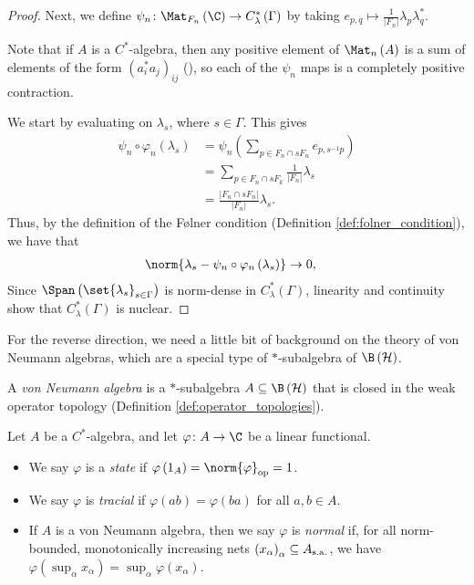 \begin{proof}
  Next, we define $\psi_n\colon \Mat_{F_n}\left( \C \right)\rightarrow C^{\ast}_{\lambda}\left( \Gamma \right)$ by taking $e_{p,q} \mapsto \frac{1}{\left\vert F_n \right\vert}\lambda_{p}\lambda_{q}^{\ast}$.\newline

  Note that if $A$ is a $C^{\ast}$-algebra, then any positive element of $\Mat_n\left( A \right)$ is a sum of elements of the form $\left( a_i^{\ast}a_j \right)_{ij}$ (\cite[Lemma 3.13]{completely_bounded_maps_and_operator_algebras}), so each of the $\psi_n$ maps is a completely positive contraction.\newline

  We start by evaluating on $\lambda_s$, where $s\in\Gamma$. This gives
  \begin{align*}
    \psi_n\circ\varphi_n\left( \lambda_s \right) &= \psi_n\left( \sum_{p\in F_n\cap sF_n}e_{p,s^{-1}p} \right)\\
                                                 &= \sum_{p\in F_n\cap sF_k}\frac{1}{\left\vert F_n \right\vert}\lambda_s\\
                                                 &= \frac{\left\vert F_n \cap sF_n \right\vert}{\left\vert F_n \right\vert}\lambda_s.
  \end{align*}
  Thus, by the definition of the Følner condition (Definition \ref{def:folner_condition}), we have that
  \begin{align*}
    \norm{\lambda_s - \psi_n\circ\varphi_n\left( \lambda_s \right)} &\rightarrow 0,
  \end{align*}
  Since $\Span\left( \set{\lambda_s}_{s\in\Gamma} \right)$ is norm-dense in $C^{\ast}_{\lambda}\left( \Gamma \right)$, linearity and continuity show that $C^{\ast}_{\lambda}\left( \Gamma \right)$ is nuclear.
\end{proof}
For the reverse direction, we need a little bit of background on the theory of von Neumann algebras, which are a special type of $\ast$-subalgebra of $\B\left( \mathcal{H} \right)$.
\begin{definition}
  A \textit{von Neumann algebra} is a $\ast$-subalgebra $A\subseteq \B\left( \mathcal{H} \right)$ that is closed in the weak operator topology (Definition \ref{def:operator_topologies}).
\end{definition}
\begin{definition}\label{def:state_linear_functional}
  Let $A$ be a $C^{\ast}$-algebra, and let $\varphi\colon A\rightarrow \C$ be a linear functional. 
  \begin{itemize}
    \item We say $\varphi$ is a \textit{state} if $\varphi\left( 1_A \right) = \norm{\varphi}_{\op} = 1$.
    \item We say $\varphi$ is \textit{tracial} if $\varphi\left( ab \right) = \varphi\left( ba \right)$ for all $a,b\in A$.
    \item If $A$ is a von Neumann algebra, then we say $\varphi$ is \textit{normal} if, for all norm-bounded, monotonically increasing nets $\left( x_{\alpha} \right)_{\alpha}\subseteq A_{\operatorname{s.a.}}$, we have $\varphi\left( \sup_{\alpha}x_{\alpha} \right) = \sup_{\alpha}\varphi\left( x_{\alpha} \right)$.
  \end{itemize}
\end{definition}
